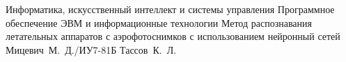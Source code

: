 \documentclass{bmstu}
\begin{document}
\makethesistitle
{Информатика, искусственный интеллект и системы управления} %
{Программное обеспечение ЭВМ и информационные технологии} %
{Метод распознавания летательных аппаратов с аэрофотоснимков с использованием нейронный сетей} %
{Мицевич~М.~Д./ИУ7-81Б} %
{Тассов~К.~Л.} %
{} %
{} %




\maketableofcontents











\makebibliography


\end{document}

